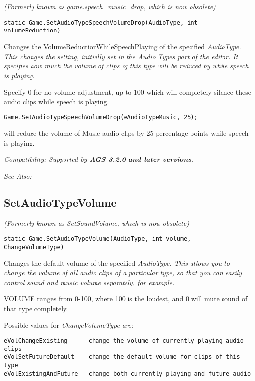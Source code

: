 \it{(Formerly known as game.speech_music_drop, which is now obsolete)}

\begin{verbatim}
static Game.SetAudioTypeSpeechVolumeDrop(AudioType, int volumeReduction)
\end{verbatim}
Changes the VolumeReductionWhileSpeechPlaying of the specified \it{AudioType}. This changes
the setting, initially set in the Audio Types part of the editor. It specifies how much
the volume of clips of this type will be reduced by while speech is playing.

Specify 0 for no volume adjustment, up to 100 which will completely silence these audio
clips while speech is playing.

\begin{verbatim}
Game.SetAudioTypeSpeechVolumeDrop(eAudioTypeMusic, 25);
\end{verbatim}
will reduce the volume of Music audio clips by 25 percentage points while speech is playing.

\it{Compatibility:} Supported by \bf{AGS 3.2.0} and later versions.

\it{See Also:} 


\subsection{SetAudioTypeVolume}\label{Game.SetAudioTypeVolume}%

\it{(Formerly known as SetSoundVolume, which is now obsolete)}

\begin{verbatim}
static Game.SetAudioTypeVolume(AudioType, int volume, ChangeVolumeType)
\end{verbatim}
Changes the default volume of the specified \it{AudioType}. This allows you to
change the volume of all audio clips of a particular type, so that you can
easily control sound and music volume separately, for example.

VOLUME ranges from 0-100, where 100 is the loudest, and 0 will mute sound of that type completely.

Possible values for \it{ChangeVolumeType} are:
\begin{verbatim}
eVolChangeExisting      change the volume of currently playing audio clips
eVolSetFutureDefault    change the default volume for clips of this type
eVolExistingAndFuture   change both currently playing and future audio
\end{verbatim}

